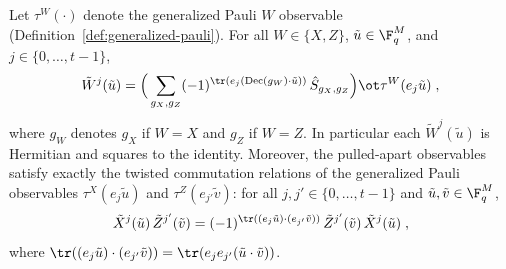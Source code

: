 \begin{lemma}\label{lem:tildew-product-form}
	\leanok
	Let $\tau^W(\cdot)$ denote the generalized Pauli $W$ observable (Definition~\ref{def:generalized-pauli}). For all $W \in \{X,Z\}$, $\tilde{u} \in \F_q^M$, and $j \in \{0,\ldots,t-1\}$,
	\begin{equation}\label{eq:tildewj-product-form}
		\tilde{W}^j(\tilde{u})
		= \Big( \sum_{g_X,g_Z} (-1)^{\tr(e_j (\mathrm{Dec}(g_W) \cdot \tilde{u}))} \, \hat{S}_{g_X,g_Z} \Big) \ot \tau^W(e_j \tilde{u})\;,
	\end{equation}
	where $g_W$ denotes $g_X$ if $W = X$ and $g_Z$ if $W = Z$. In particular each $\tilde{W}^j(\tilde{u})$ is Hermitian and squares to the identity. Moreover, the pulled-apart observables satisfy exactly the twisted commutation relations of the generalized Pauli observables $\tau^X(e_j \tilde{u})$ and $\tau^Z(e_{j'} \tilde{v})$: for all $j,j' \in \{0,\ldots,t-1\}$ and $\tilde{u},\tilde{v} \in \F_q^M$,
	\begin{equation}\label{eq:tildew-twisted-commutation}
		\tilde{X}^j(\tilde{u})\, \tilde{Z}^{j'}(\tilde{v})
		= (-1)^{\tr((e_j \tilde{u}) \cdot (e_{j'} \tilde{v}))}\, \tilde{Z}^{j'}(\tilde{v})\, \tilde{X}^j(\tilde{u})\;,
	\end{equation}
	where $\tr((e_j \tilde{u}) \cdot (e_{j'} \tilde{v})) = \tr(e_j e_{j'} (\tilde{u} \cdot \tilde{v}))$.
\end{lemma}
